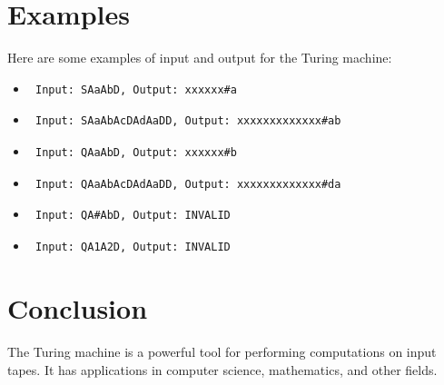 \documentclass{article}
\begin{document}
\section{Examples}
Here are some examples of input and output for the Turing machine:
\begin{itemize}
    \item \begin{verbatim} Input: SAaAbD, Output: xxxxxx#a \end{verbatim}
    \item \begin{verbatim} Input: SAaAbAcDAdAaDD, Output: xxxxxxxxxxxxx#ab \end{verbatim}
    \item \begin{verbatim} Input: QAaAbD, Output: xxxxxx#b \end{verbatim}
    \item \begin{verbatim} Input: QAaAbAcDAdAaDD, Output: xxxxxxxxxxxxx#da \end{verbatim}
    \item \begin{verbatim} Input: QA#AbD, Output: INVALID \end{verbatim}
    \item \begin{verbatim} Input: QA1A2D, Output: INVALID \end{verbatim}
\end{itemize}

\section{Conclusion}
The Turing machine is a powerful tool for performing computations on input tapes. It has applications in computer science, mathematics, and other fields.
\end{document}
